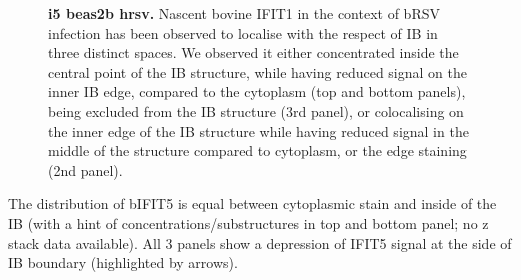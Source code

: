 \begin{figure}
\begin{subfigure}{1\textwidth}
    \end{subfigure}
    \caption[i5 beas2b hrsv]{\textbf{i5 beas2b hrsv.} Nascent bovine IFIT1 in the context of bRSV infection has been observed to localise with the respect of IB in three distinct spaces. We observed it either concentrated inside the central point of the IB structure, while having reduced signal on the inner IB edge, compared to the cytoplasm (top and bottom panels), being excluded from the IB structure (3rd panel), or colocalising on the inner edge of the IB structure while having reduced signal in the middle of the structure compared to cytoplasm, or the edge staining (2nd panel).}
    \label{fig:i5 beas2b hrsv}
\end{figure}

The distribution of bIFIT5 is equal between cytoplasmic stain and inside of the IB (with a hint of concentrations/substructures in top and bottom panel; no z stack data available). All 3 panels show a depression of IFIT5 signal at the side of IB boundary (highlighted by arrows).

